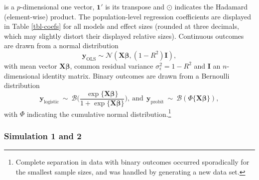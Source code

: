 \documentclass[
]{article}
\begin{document}
is a \(p\)-dimensional one vector, \(\boldsymbol{1'}\) is its transpose
and \(\odot\) indicates the Hadamard (element-wise) product. The
population-level regression coefficients are displayed in Table
\ref{tbl-coefs} for all models and effect sizes (rounded at three
decimals, which may slightly distort their displayed relative sizes).
Continuous outcomes are drawn from a normal distribution \[
\boldsymbol{y}_{\text{OLS}} \sim \mathcal{N}(\boldsymbol{X\beta}, (1 - R^2)\boldsymbol{I}),
\] with mean vector \(\boldsymbol{X\beta}\), common residual variance
\(\sigma_{\epsilon}^2=1-R^2\) and \(\boldsymbol{I}\) an
\(n\)-dimensional identity matrix. Binary outcomes are drawn from a
Bernoulli distribution \[
\boldsymbol{y}_{\text{logistic}} ~ \sim ~ \mathcal{B}\Big(\frac{\exp\{\boldsymbol{X\beta}\}}{1 + \exp\{\boldsymbol{X\beta}\}}\Big), 
~ \text{and} ~~
\boldsymbol{y}_{\text{probit}} ~ \sim ~ \mathcal{B}(\Phi\{\boldsymbol{X\beta}\}),
\] with \(\Phi\) indicating the cumulative normal
distribution.\footnote{Complete separation in data with binary outcomes
  occurred sporadically for the smallest sample sizes, and was handled
  by generating a new data set.}

\begin{table}[t]
\centering
\caption{Population-level regression coefficients for ordinary least squares (OLS), logistic and probit regression, given effect sizes of $R^2 \in \{0.02, 0.09, 0.25\}$.} 
\label{tbl-coefs}
\end{table}

\hypertarget{simulation-1-and-2}{%
\subsubsection{Simulation 1 and 2}\label{simulation-1-and-2}}
\end{document}
